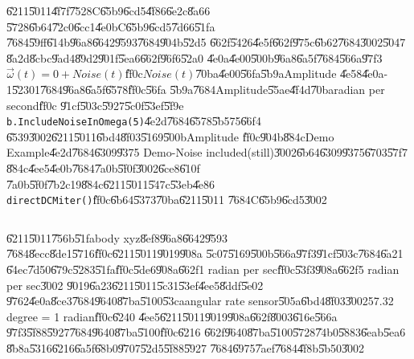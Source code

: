 \U{6211}\U{5011}\U{4f7f}\U{7528}C\U{65b9}\U{6cd5}\U{4f86}\U{6e2c}\U{8a66}%
\U{5728}\U{6b64}\U{72c0}\U{6cc1}\U{4e0b}C\U{65b9}\U{6cd5}\U{7d66}\U{51fa}%
\U{7684}\U{59ff}\U{614b}\U{96a8}\U{6642}\U{9593}\U{7684}\U{904b}\U{52d5}%
\U{662f}\U{5426}\U{4e5f}\U{662f}\U{975c}\U{6b62}\U{7684}\U{3002}\U{5047}%
\U{8a2d}\U{8cbc}\U{9ad4}\U{89d2}\U{901f}\U{5ea6}\U{662f}\U{96f6}\U{52a0}%
\U{4e0a}\U{4e00}\U{500b}\U{96a8}\U{6a5f}\U{7684}\U{566a}\U{97f3}$\vec{\omega}%
(t)=0+Noise(t)$\U{ff0c}$Noise(t)$\U{70ba}\U{4e00}\U{56fa}\U{5b9a}Amplitude%
\U{4e58}\U{4e0a}-1\U{5230}1\U{7684}\U{96a8}\U{6a5f}\U{6578}\U{ff0c}\U{56fa}%
\U{5b9a}\U{7684}Amplitude\U{55ae}\U{4f4d}\U{70ba}radian per second\U{ff0c}%
\U{91cf}\U{503c}\U{5927}\U{5c0f}\U{53ef}\U{5f9e}\newline
\texttt{b.IncludeNoiseInOmega(5)}\U{4e2d}\U{7684}\U{6578}\U{5b57}5\U{66f4}%
\U{6539}\U{3002}\U{6211}\U{5011}\U{6bd4}\U{8f03}\U{5169}\U{500b}Amplitude%
\U{ff0c}\U{904b}\U{884c}Demo Example\U{4e2d}\U{7684}\U{6309}\U{9375}%
Demo-Noise included(still)\U{3002}\U{6b64}\U{6309}\U{9375}\U{6703}\U{57f7}%
\U{884c}\U{4ee5}\U{4e0b}\U{7684}\U{7a0b}\U{5f0f}\U{3002}\U{6ce8}\U{610f}%
\U{7a0b}\U{5f0f}\U{7b2c}19\U{884c}\U{6211}\U{5011}\U{547c}\U{53eb}\U{4e86}%
\texttt{directDCMiter()}\U{ff0c}\U{6b64}\U{5373}\U{70ba}\U{6211}\U{5011}%
\U{7684}C\U{65b9}\U{6cd5}\U{3002}

\begin{mdframed}[leftline=false, rightline=false,backgroundcolor=bg]
\inputminted[linenos,fontsize=\footnotesize,breaklines,breakanywhere]{python}{../../Scripts/cordtrans/Demo_Examples/Gyroscope-TeachDemo-5-NoiseIncludeInCMethod_still.py}
\end{mdframed}%

\U{6211}\U{5011}\U{756b}\U{51fa}body xyz\U{8ef8}\U{96a8}\U{6642}\U{9593}%
\U{7684}\U{8ecc}\U{8de1}\U{5716}\U{ff0c}\U{6211}\U{5011}\U{9019}\U{908a}%
\U{5c07}\U{5169}\U{500b}\U{566a}\U{97f3}\U{91cf}\U{503c}\U{7684}\U{6a21}%
\U{64ec}\U{7d50}\U{679c}\U{5283}\U{51fa}\U{ff0c}\U{5de6}\U{908a}\U{662f}1
radian per sec\U{ff0c}\U{53f3}\U{908a}\U{662f}5 radian per sec\U{3002}%
\U{9019}\U{6a23}\U{6211}\U{5011}\U{5c31}\U{53ef}\U{4ee5}\U{8ddf}\U{5e02}%
\U{9762}\U{4e0a}\U{8ce3}\U{7684}\U{9640}\U{87ba}\U{5100}\U{53ca}angular rate
sensor\U{505a}\U{6bd4}\U{8f03}\U{3002}57.32 degree = 1 radian\U{ff0c}\U{6240}%
\U{4ee5}\U{6211}\U{5011}\U{9019}\U{908a}\U{662f}\U{8003}\U{616e}\U{566a}%
\U{97f3}\U{5f88}\U{5927}\U{7684}\U{9640}\U{87ba}\U{5100}\U{ff0c}\U{6216}%
\U{662f}\U{9640}\U{87ba}\U{5100}\U{5728}\U{74b0}\U{5883}\U{6eab}\U{5ea6}%
\U{8b8a}\U{5316}\U{6216}\U{6a5f}\U{68b0}\U{9707}\U{52d5}\U{5f88}\U{5927}%
\U{7684}\U{6975}\U{7aef}\U{7684}\U{4f8b}\U{5b50}\U{3002}

